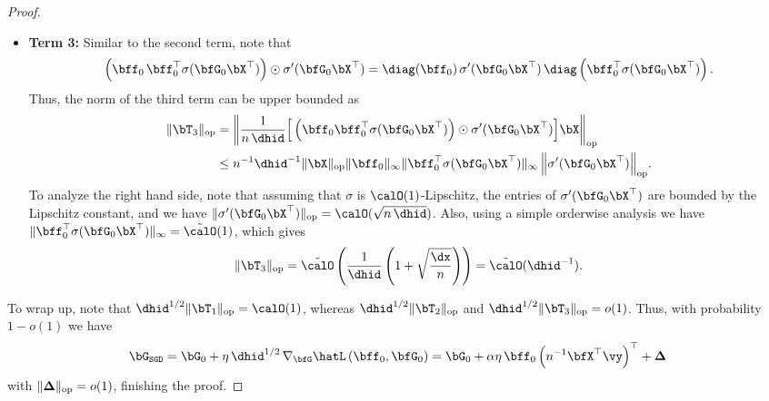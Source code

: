 \begin{proof}
\begin{itemize}
        \item \textbf{Term 3:} Similar to the second term, note that
        \begin{align*}
            \left(\bff_0\, \bff_0^\top \sigma(\bfG_0 \bX^\top)\right) \odot \sigma'(\bfG_0 \bX^\top) = \diag(\bff_0)\,  \sigma'(\bfG_0 \bX^\top) \, \diag\left(\bff_0^\top \sigma(\bfG_0 \bX^\top)\right).
        \end{align*}
        Thus, the norm of the third term can be upper bounded as
            \begin{align*}
                \|\bT_3\|_{\rm op}&=\left\|\frac{1}{n \, \dhid}  \Big[\left(\bff_0 \bff_0^\top \sigma(\bfG_0 \bX^\top)\right) \odot \sigma'(\bfG_0 \bX^\top)\Big]\bX\right\|_{\rm op}\\ &\leq n^{-1} \dhid^{-1}{\|\bX\|_{\rm op}\|\bff_0\|_{\rm \infty}\|\bff_0^\top \sigma(\bfG_0 \bX^\top)\|_{\rm \infty} \left\|\sigma'(\bfG_0 \bX^\top)\right\|_{\rm op}}.
            \end{align*}
            To analyze the right hand side, note that assuming that $\sigma$ is $\calO(1)$-Lipschitz, the entries of $\sigma'(\bfG_0 \bX^\top)$ are bounded by the Lipschitz constant, and we have $\|\sigma'(\bfG_0 \bX^\top)\|_{\rm op} = \calO(\sqrt{n \,\dhid})$. Also, using a simple orderwise analysis we have $\|\bff_0^\top \sigma(\bfG_0 \bX^\top)\|_{\rm \infty} = \tilde \calO(1)$, which gives
            \begin{align*}
                \|\bT_3\|_{\rm op} = \tilde \calO\left(\frac{1}{ \dhid}\left(1 + \sqrt\frac{\dx}{n}\right)\right) = \tilde{\calO}(\dhid^{-1}).
            \end{align*}
    \end{itemize}
    To wrap up, note that $\dhid^{1/2} \|\bT_1\|_{\rm op} = \calO(1)$, whereas $\dhid^{1/2} \|\bT_2\|_{\rm op}$ and $\dhid^{1/2} \|\bT_3\|_{\rm op} = o(1)$. Thus, with probability $1 - o(1)$ we have
    \begin{align*}
        \bG_{\texttt{SGD}} = \bG_0 + \eta\,\dhid^{1/2}\, \nabla_\bfG \hatL\,(\bff_0,\bfG_0) = \bG_0 + \alpha \eta\, \bff_0 \left(n^{-1} \bfX^\top \vy\right)^\top + \mathbf{\Delta}
    \end{align*}
    with $\|\mathbf{\Delta}\|_{\rm op} = o(1)$, finishing the proof.
\end{proof}
